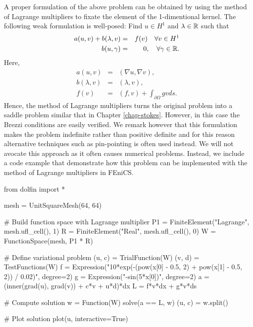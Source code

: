 A proper formulation of the above problem can be obtained by using the method
of Lagrange multipliers to fixate the element of the 1-dimentional
kernel. The following weak formulation is well-posed:
Find $u\in H^1$ and $\lambda \in \mathbb{R}$ such that
\begin{eqnarray}
\label{poisson:neu1}
a(u,v) + b(\lambda, v) &=& f(v) \quad \forall v\in H^1 \\
\label{poisson:neu2}
b(u, \gamma) &=& 0, \quad \forall \gamma \in \mathbb{R}.
\end{eqnarray}
Here,
\begin{eqnarray}
\label{poisson:neu3}
a(u,v) &=& (\nabla u, \nabla v), \\
\label{poisson:neu4}
b(\lambda, v) &=& (\lambda, v), \\
\label{poisson:neu5}
f(v) &=& (f,v) + \int_{\partial \Omega} g v ds .
\end{eqnarray}
Hence, the method of Lagrange multipliers turns the original problem
into a saddle problem similar that in Chapter \ref{chap-stokes}. However,
in this case the Brezzi conditions are easily verified. We remark
however that this formulation makes the problem indefinite rather
than positive definite and for this reason alternative techniques
such as pin-pointing is often used instead. We will not avocate this
approach as it often causes numerical problems. Instead, we
include a code example that demonstrate how this problem can
be implemented with the method of Lagrange multipliers in FEniCS.
\begin{python}
from dolfin import *

mesh = UnitSquareMesh(64, 64)

# Build function space with Lagrange multiplier
P1 = FiniteElement("Lagrange", mesh.ufl_cell(), 1)
R = FiniteElement("Real", mesh.ufl_cell(), 0)
W = FunctionSpace(mesh, P1 * R)

# Define variational problem
(u, c) = TrialFunction(W)
(v, d) = TestFunctions(W)
f = Expression("10*exp(-(pow(x[0] - 0.5, 2) + pow(x[1] - 0.5, 2)) / 0.02)", degree=2)
g = Expression("-sin(5*x[0])", degree=2)
a = (inner(grad(u), grad(v)) + c*v + u*d)*dx
L = f*v*dx + g*v*ds

# Compute solution
w = Function(W)
solve(a == L, w)
(u, c) = w.split()

# Plot solution
plot(u, interactive=True)
\end{python}

